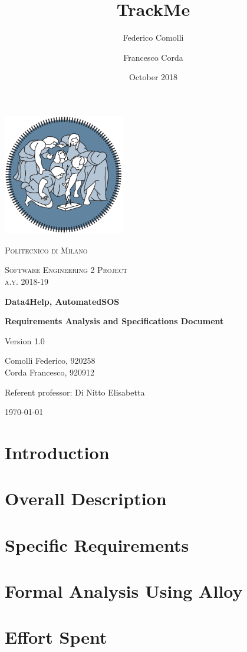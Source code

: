 \documentclass{report}
\title{TrackMe}
\author{Federico Comolli
        \and
        Francesco Corda}
\date{October 2018}
\begin{document}
\begin{titlepage}
	\centering
	\includegraphics[width=150pt]{images/polimi_logo}\par\vspace{1cm}
	{\scshape\LARGE
		Politecnico di Milano\par}
	\vspace{1cm}
	{\scshape\Large
		Software Engineering 2 Project\\
		a.y. 2018-19\par}
	\vspace{1.5cm}
	{\huge\bfseries
		Data4Help, AutomatedSOS\\\par}
	{\Large\bfseries
		Requirements Analysis and Specifications Document\par}
	Version 1.0\par
	\vspace{2cm}
	{\Large
		Comolli Federico, 920258\\
		Corda Francesco, 920912\par}
	\vfill
	Referent professor: Di Nitto Elisabetta\par
	\vfill
	{\large\today\par}
\end{titlepage}
\renewcommand{\contentsname}{Table of Contents}
\tableofcontents


\chapter{Introduction}


\chapter{Overall Description}


\chapter{Specific Requirements}


\chapter{Formal Analysis Using Alloy}


\chapter{Effort Spent \cite{adams1995hitchhiker}}
 



\end{document}
